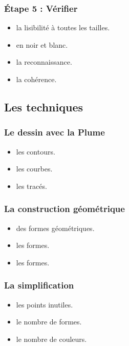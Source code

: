 \subsubsection{Étape 5 : Vérifier}

\begin{itemize}
    \item {} la lisibilité à toutes les tailles.
    \item {} en noir et blanc.
    \item {} la reconnaissance.
    \item {} la cohérence.
\end{itemize}

\subsection{Les techniques}

\subsubsection{Le dessin avec la Plume}

\begin{itemize}
    \item {} les contours.
    \item {} les courbes.
    \item {} les tracés.
\end{itemize}

\subsubsection{La construction géométrique}

\begin{itemize}
    \item {} des formes géométriques.
    \item {} les formes.
    \item {} les formes.
\end{itemize}

\subsubsection{La simplification}

\begin{itemize}
    \item {} les points inutiles.
    \item {} le nombre de formes.
    \item {} le nombre de couleurs.
\end{itemize}


